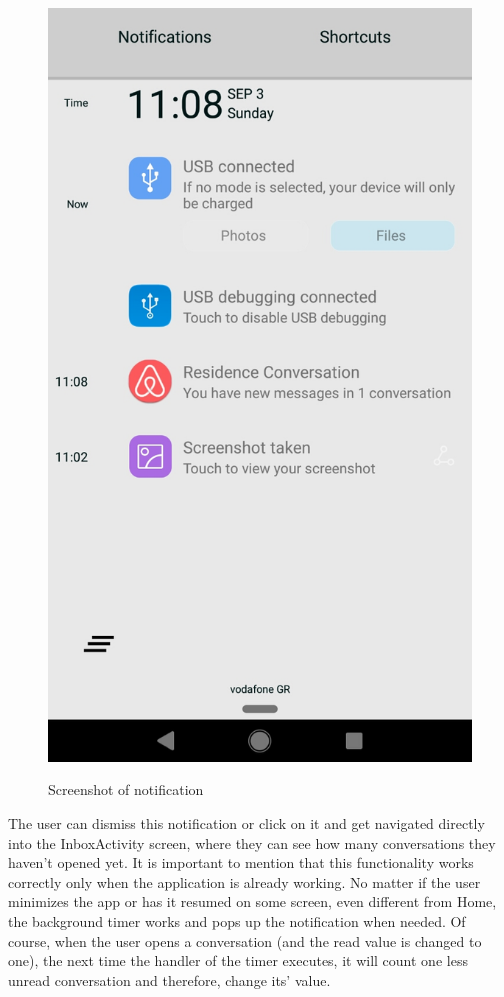 \documentclass[12pt]{article}
\begin{document}
	\begin{figure} [H]
		\begin{center}
			\includegraphics [scale = 0.18] {notification.jpg}\\[1.0 cm]
			\caption{Screenshot of notification}
		\end{center}
	\end{figure}
	
	The user can dismiss this notification or click on it and get navigated directly into the InboxActivity screen, where they can see how many conversations they haven't opened yet. It is important to mention that this functionality works correctly only when the application is already working. No matter if the user minimizes the app or has it resumed on some screen, even different from Home, the background timer works and pops up the notification when needed. Of course, when the user opens a conversation (and the read value is changed to one), the next time the handler of the timer executes, it will count one less unread conversation and therefore, change its' value.
	
\end{document}
